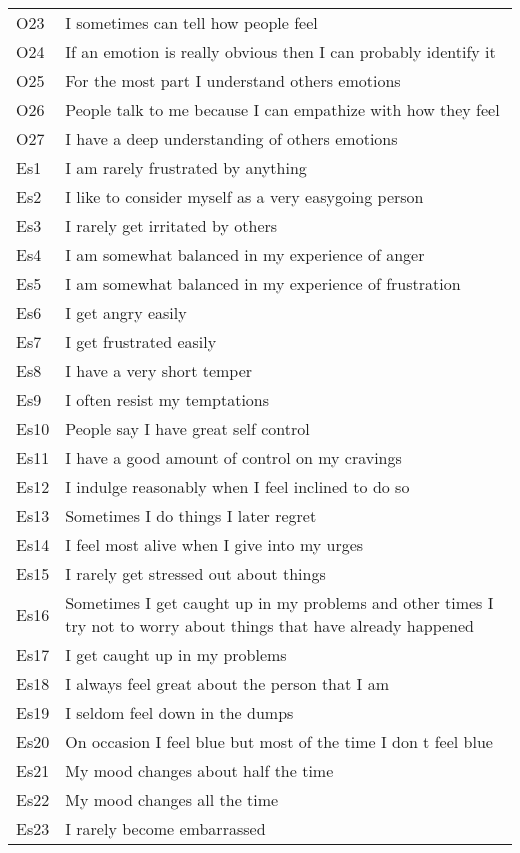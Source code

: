 \documentclass[english,man]{apa6}
\theoremstyle{definition}
\theoremstyle{definition}
\theoremstyle{remark}
\begin{document}
\begin{longtable}{ll}
O23 & I sometimes can tell how people feel\\
O24 & If an emotion is really obvious then I can probably identify it\\
O25 & For the most part I understand others  emotions\\
\addlinespace
O26 & People talk to me  because I can empathize with how they feel\\
O27 & I have a deep understanding of others  emotions\\
Es1 & I am rarely frustrated by anything\\
Es2 & I like to consider myself as a very easygoing person\\
Es3 & I rarely get irritated by others\\
\addlinespace
Es4 & I am somewhat balanced in my experience of anger\\
Es5 & I am somewhat balanced in my experience of frustration\\
Es6 & I get angry easily\\
Es7 & I get frustrated easily\\
Es8 & I have a very short temper\\
\addlinespace
Es9 & I often resist my temptations\\
Es10 & People say I have great  self control\\
Es11 & I have a good amount of control on my cravings\\
Es12 & I indulge reasonably when I feel inclined to do so\\
Es13 & Sometimes I do things I later regret\\
\addlinespace
Es14 & I feel most alive when I give into my urges\\
Es15 & I rarely get stressed out about things\\
Es16 & Sometimes I get caught up in my problems  and other times I try not to worry about things that have already happened\\
Es17 & I get caught up in my problems\\
Es18 & I always feel great about the person that I am\\
\addlinespace
Es19 & I seldom feel down in the dumps\\
Es20 & On occasion  I feel blue  but most of the time I don t feel blue\\
Es21 & My mood changes about half the time\\
Es22 & My mood changes all the time\\
Es23 & I rarely become embarrassed\\

\end{longtable}
\end{document}
